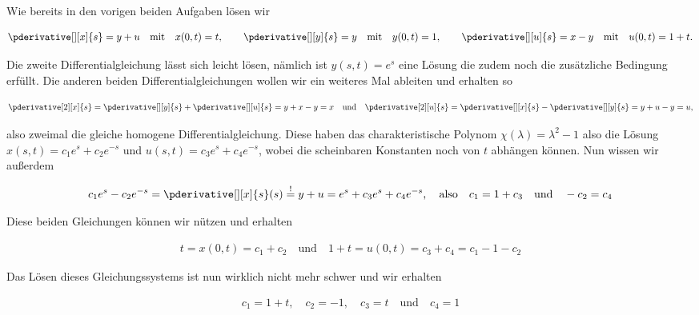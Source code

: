 
\begin{solution}

Wie bereits in den vorigen beiden Aufgaben lösen wir

\begin{align*}
    \pderivative[][x]{s} = y + u \quad \text{mit} \quad x(0,t) = t, \qquad
    \pderivative[][y]{s} = y \quad \text{mit} \quad y(0,t) = 1, \qquad
    \pderivative[][u]{s} = x - y \quad \text{mit} \quad u(0,t) = 1 + t .
\end{align*}

Die zweite Differentialgleichung lässt sich leicht lösen, nämlich ist $y(s,t) = e^s$ eine Lösung die zudem noch die zusätzliche Bedingung erfüllt. Die anderen beiden Differentialgleichungen wollen wir ein weiteres Mal ableiten und erhalten so

\begin{align*}
    \pderivative[2][x]{s} = \pderivative[][y]{s} + \pderivative[][u]{s} = y  + x - y = x \quad \text{und} \quad \pderivative[2][u]{s} = \pderivative[][x]{s} - \pderivative[][y]{s} = y + u - y = u,
\end{align*}

also zweimal die gleiche homogene Differentialgleichung. Diese haben das charakteristische Polynom $\chi(\lambda) = \lambda^2 -1$ also die Lösung $x(s,t) = c_1 e^s + c_2 e^{-s}$ und $u(s,t) = c_3 e^s + c_4 e^{-s}$, wobei die scheinbaren Konstanten noch von $t$ abhängen können. Nun wissen wir außerdem

\begin{align*}
    c_1 e^s - c_2 e^{-s} = \pderivative[][x]{s}(s)\stackrel{!}{=} y + u = e^s + c_3 e^s + c_4 e^{-s}, \quad \text{also} \quad c_1 = 1 + c_3 \quad \text{und} \quad -c_2 = c_4
\end{align*}

Diese beiden Gleichungen können wir nützen und erhalten

\begin{align*}
    t = x(0,t) = c_1 + c_2 \quad \text{und} \quad 1 + t = u(0,t) = c_3 + c_4 = c_1 - 1 - c_2
\end{align*}

Das Lösen dieses Gleichungssystems ist nun wirklich nicht mehr schwer und wir erhalten

\begin{align*}
    c_1 = 1 + t, \quad c_2 = -1, \quad c_3 = t \quad \text{und} \quad c_4 = 1
\end{align*}


\end{solution}
